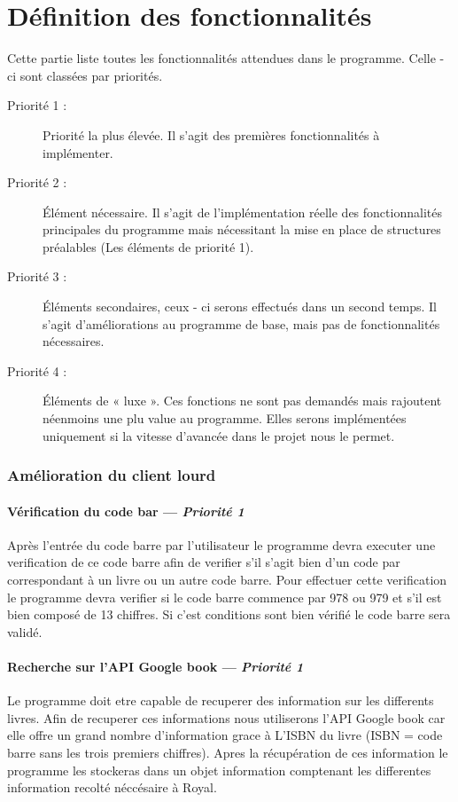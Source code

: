 \part{Définition des fonctionnalités}
Cette partie liste toutes les fonctionnalités attendues dans le programme. Celle - ci sont classées par priorités.

\begin{description}
\item [Priorité 1 :]
	Priorité la plus élevée. Il s'agit des premières fonctionnalités à implémenter.

\item [Priorité 2 :]
	Élément nécessaire. Il s'agit de l'implémentation réelle des fonctionnalités principales du programme mais nécessitant la mise en place de structures préalables (Les éléments de priorité 1). 

\item [Priorité 3 :]
	Éléments secondaires, ceux - ci serons effectués dans un second temps. Il s'agit d'améliorations au programme de base, mais pas de fonctionnalités nécessaires.  

\item [Priorité 4 :]
	Éléments de « luxe ». Ces fonctions ne sont pas demandés mais rajoutent néenmoins une plu value au programme. Elles serons implémentées uniquement si la vitesse d'avancée dans le projet nous le permet.
\end{description}


\section{Amélioration du client lourd}


\subsection[Vérification du code bar]{Vérification du code bar — \emph{Priorité 1}}
Après l'entrée du code barre par l'utilisateur le programme devra executer une verification de ce code barre afin de verifier s'il s'agit bien d'un code par correspondant à un livre ou un autre code barre. Pour effectuer cette verification le programme devra verifier si le code barre commence par 978 ou 979 et s'il est bien composé de 13 chiffres. Si c'est conditions sont bien vérifié le code barre sera validé. 

\subsection[Recherche sur l'API Google book]{Recherche sur l'API Google book — \emph{Priorité 1}}
Le programme doit etre capable de recuperer des information sur les differents livres. Afin de recuperer ces informations nous utiliserons l'API Google book car elle offre un grand nombre d'information grace à L'ISBN du livre (ISBN = code barre sans les trois premiers chiffres). Apres la récupération de ces information le programme les stockeras dans un objet information comptenant les differentes information recolté néccésaire à Royal.  


